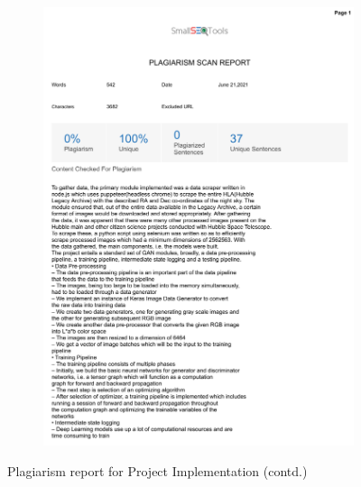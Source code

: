 \documentclass[oneside,a4paper,12pt]{report}
\begin{document}
\begin{appendices}
\begin{figure}
\begin{subfigure}[H]{\textwidth}
    	\includegraphics[scale=0.7, page=2]{plagiarism/project_implementation.pdf}
    \end{subfigure}
    \caption{Plagiarism report for Project Implementation (contd.)}
    \label{PlagiarismImplementation_1}
\end{figure}


\end{appendices}
\end{document}
